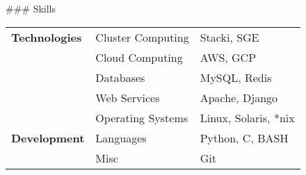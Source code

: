 ### Skills

\begin{table}[h]
\begin{tabular}{l l l}
\textbf{Technologies} & Cluster Computing & Stacki, SGE           \\
                      & Cloud Computing   & AWS, GCP              \\
                      & Databases         & MySQL, Redis          \\
                      & Web Services      & Apache, Django        \\    
                      & Operating Systems & Linux, Solaris, *nix  \\
\textbf{Development}  &  Languages        & Python, C, BASH       \\
                      & Misc              &  Git                  
\end{tabular}
\end{table}

